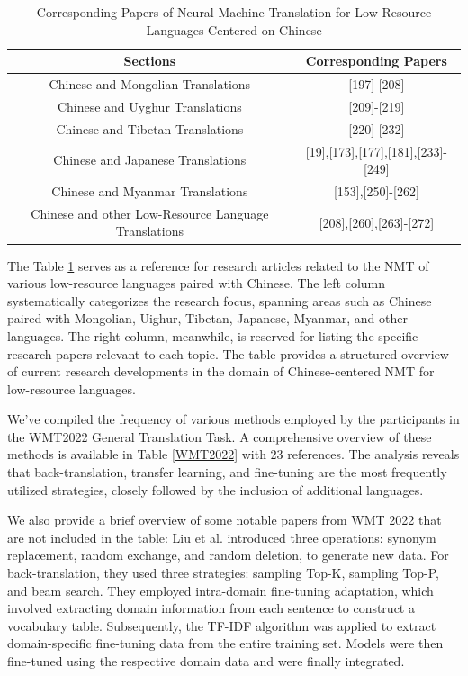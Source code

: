 \documentclass[acmsmall]{acmart}
\begin{document}
\begin{table}[h!]
\centering
\caption{Corresponding Papers of Neural Machine Translation for Low-Resource Languages Centered on Chinese}
\label{tab:chapters}

\begin{tabular}{cc}
\toprule
Sections & Corresponding Papers \\
\midrule
\cmidrule{1-2}
Chinese and Mongolian Translations & [197]-[208]\\
Chinese and Uyghur Translations & [209]-[219]\\
Chinese and Tibetan Translations & [220]-[232]\\
\cmidrule{1-2}
Chinese and Japanese Translations & [19],[173],[177],[181],[233]-[249]\\
Chinese and Myanmar Translations & [153],[250]-[262]\\
Chinese and other Low-Resource Language Translations & [208],[260],[263]-[272]\\
\bottomrule
\end{tabular}

\end{table}




The Table \ref{tab:chapters} serves as a reference for research articles related to the NMT of various low-resource languages paired with Chinese. The left column systematically categorizes the research focus, spanning areas such as Chinese paired with Mongolian, Uighur, Tibetan, Japanese, Myanmar, and other languages. The right column, meanwhile, is reserved for listing the specific research papers relevant to each topic. The table provides a structured overview of current research developments in the domain of Chinese-centered NMT for low-resource languages.

We've compiled the frequency of various methods employed by the participants in the WMT2022 General Translation Task. A comprehensive overview of these methods is available in Table \ref{WMT2022} with 23 references. The analysis reveals that back-translation, transfer learning, and fine-tuning are the most frequently utilized strategies, closely followed by the inclusion of additional languages.  


We also provide a brief overview of some notable papers from WMT 2022 that are not included in the table:
Liu et al. \cite{6-1} introduced three operations: synonym replacement, random exchange, and random deletion, to generate new data. For back-translation, they used three strategies: sampling Top-K, sampling Top-P, and beam search. They employed intra-domain fine-tuning adaptation, which involved extracting domain information from each sentence to construct a vocabulary table. Subsequently, the TF-IDF algorithm was applied to extract domain-specific fine-tuning data from the entire training set. Models were then fine-tuned using the respective domain data and were finally integrated.
\end{document}
